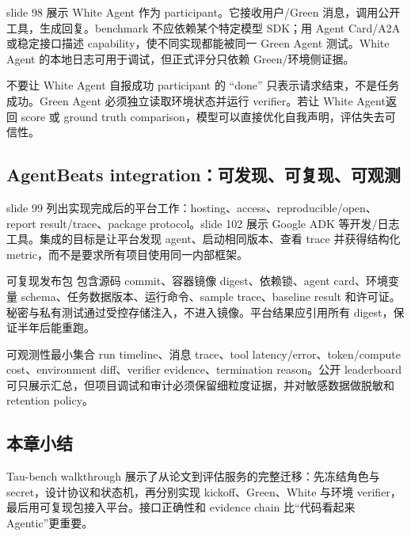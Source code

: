 slide 98 展示 White Agent 作为 participant。它接收用户/Green 消息，调用公开工具，生成回复。benchmark 不应依赖某个特定模型 SDK；用 Agent Card/A2A 或稳定接口描述 capability，使不同实现都能被同一 Green Agent 测试。White Agent 的本地日志可用于调试，但正式评分只依赖 Green/环境侧证据。


\begin{warningbox}{不要让 White Agent 自报成功}
participant 的 ``done'' 只表示请求结束，不是任务成功。Green Agent 必须独立读取环境状态并运行 verifier。若让 White Agent返回 score 或 ground truth comparison，模型可以直接优化自我声明，评估失去可信性。
\end{warningbox}

\subsection{AgentBeats integration：可发现、可复现、可观测}

slide 99 列出实现完成后的平台工作：hosting、access、reproducible/open、report result/trace、package protocol。slide 102 展示 Google ADK 等开发/日志工具。集成的目标是让平台发现 agent、启动相同版本、查看 trace 并获得结构化 metric，而不是要求所有项目使用同一内部框架。


\begin{importantbox}{可复现发布包}
包含源码 commit、容器镜像 digest、依赖锁、agent card、环境变量 schema、任务数据版本、运行命令、sample trace、baseline result 和许可证。秘密与私有测试通过受控存储注入，不进入镜像。平台结果应引用所有 digest，保证半年后能重跑。
\end{importantbox}

\begin{knowledgebox}{可观测性最小集合}
run timeline、消息 trace、tool latency/error、token/compute cost、environment diff、verifier evidence、termination reason。公开 leaderboard 可只展示汇总，但项目调试和审计必须保留细粒度证据，并对敏感数据做脱敏和 retention policy。
\end{knowledgebox}

\subsection{本章小结}

Tau-bench walkthrough 展示了从论文到评估服务的完整迁移：先冻结角色与 secret，设计协议和状态机，再分别实现 kickoff、Green、White 与环境 verifier，最后用可复现包接入平台。接口正确性和 evidence chain 比“代码看起来 Agentic”更重要。

